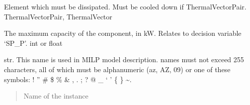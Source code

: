 \documentclass[letterpaper,10pt,english]{sphinxmanual}
\begin{document}
\begin{fulllineitems}
\begin{fulllineitems}
\end{fulllineitems}


\begin{fulllineitems}
\label{\detokenize{generated/tamos.production.DryCooler:tamos.production.DryCooler.energy_source}}
\pysigstartsignatures
{}
\pysigstopsignatures
\sphinxAtStartPar
Element which must be dissipated.
Must be cooled down if ThermalVectorPair.
ThermalVectorPair, ThermalVector

\end{fulllineitems}


\begin{fulllineitems}
\label{\detokenize{generated/tamos.production.DryCooler:tamos.production.DryCooler.given_sizing}}
\pysigstartsignatures
{}
\pysigstopsignatures
\sphinxAtStartPar
The maximum capacity of the component, in kW.
Relates to decision variable ‘SP\_P’.
int or float

\end{fulllineitems}


\begin{fulllineitems}
\label{\detokenize{generated/tamos.production.DryCooler:tamos.production.DryCooler.name}}
\pysigstartsignatures
{}
\pysigstopsignatures
\sphinxAtStartPar
str.
This name is used in MILP model description.
names must not exceed 255 characters,
all of which must be alphanumeric (a\sphinxhyphen{}z, A\sphinxhyphen{}Z, 0\sphinxhyphen{}9) or one of these symbols:
! ” \# \$ \% \& , . ; ? @ \_ ‘ ’ \{ \} \textasciitilde{}.
\begin{quote}\begin{description}
\sphinxAtStartPar
Name of the instance

\end{description}\end{quote}


\end{fulllineitems}
\end{fulllineitems}
\end{document}

